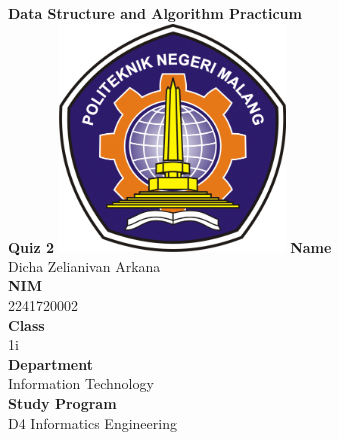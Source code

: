 \documentclass[12pt,titlepage]{article}
\newcommand{\vSubject}{Data Structure and Algorithm Practicum}
\newcommand{\vSubtitle}{Quiz 2}
\newcommand{\vName}{Dicha Zelianivan Arkana}
\newcommand{\vNIM}{2241720002}
\newcommand{\vClass}{1i}
\newcommand{\vDepartment}{Information Technology}
\newcommand{\vStudyProgram}{D4 Informatics Engineering}
\begin{document}
\begin{titlepage}
    \centering
    \vfill
    {\bfseries\LARGE
        \vSubject\\
        \vskip0.25cm
        \vSubtitle
    }
    \vfill
    \includegraphics[width=6cm]{images/polinema-logo.png}
    \vfill
    {
        \textbf{Name}\\
        \vName\\
        \vskip0.5cm
        \textbf{NIM}\\
        \vNIM\\
        \vskip0.5cm
        \textbf{Class}\\
        \vClass\\
        \vskip0.5cm
        \textbf{Department}\\
        \vDepartment\\
        \vskip0.5cm
        \textbf{Study Program}\\
        \vStudyProgram
    }
\end{titlepage}
\end{document}
